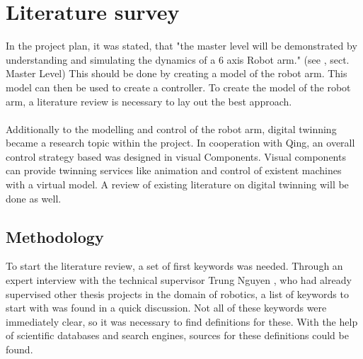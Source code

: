 \chapter{Literature survey}

In the project plan, it was stated, that "the master level will be demonstrated by understanding and simulating the dynamics of a 6 axis Robot arm." (see \cite{ProjectPlan}, sect. Master Level)
This should be done by creating a model of the robot arm. This model can then be used to create a controller.
To create the model of the robot arm, a literature review is necessary to lay out the best approach.\\
\\ 

Additionally to the modelling and control of the robot arm, digital twinning became a research topic within the project. In cooperation with Qing, an overall control strategy based was designed in visual Components. Visual components can provide twinning services like animation and control of existent machines with a virtual model.
A review of existing literature on digital twinning will be done as well.
\bigskip




\section{Methodology}

To start the literature review, a set of first keywords was needed. Through an expert interview with the technical supervisor Trung Nguyen \cite{Trung}, who had already supervised other thesis projects in the domain of robotics, a list of keywords to start with was found in a quick discussion. 
Not all of these keywords were immediately clear, so it was necessary to find definitions for these. 
With the help of scientific databases and search engines, sources for these definitions could be found.\\




